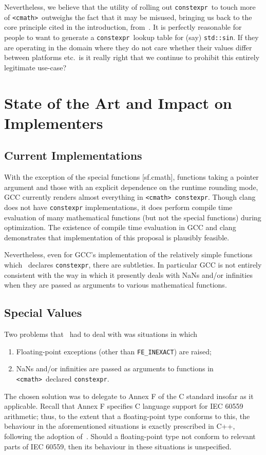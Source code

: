 \documentclass[prd,twocolumn,amsmath,amssymb,nofootinbib,eqsecnum]{revtex4-1}
\newcommand{\constexpr}{\code{constexpr}\xspace}
\newcommand{\code}[1]{{\tt #1}}
\newcommand{\header}[1]{{\tt <#1>}}
\newcommand{\cmath}{\header{cmath}}
\newcommand{\FEINEXACT}{{\tt FE\_INEXACT}}
\begin{document}
Nevertheless, we believe that the utility of rolling out \constexpr\ to touch more of \cmath\ outweighs the fact that it may be misused, bringing us back to the core principle cited in the introduction, from~\cite{DandE}.
It is perfectly reasonable for people to want to generate a \constexpr\ lookup table for (say) \code{std::sin}. If they are operating in the domain where they do not care whether their values differ between platforms etc.\ is it really right that we continue to prohibit this entirely legitimate use-case?

\section{State of the Art and Impact on Implementers}

\subsection{Current Implementations}

With the exception of the special functions [sf.cmath], functions taking a pointer argument and those with an explicit dependence on the runtime rounding mode, GCC currently renders almost everything in \cmath\ \constexpr. Though clang does not have \constexpr implementations, it does perform compile time evaluation of many mathematical functions (but not the special functions) during optimization. The existence of compile time evaluation in GCC and clang demonstrates that implementation of this proposal is plausibly feasible. 

Nevertheless, even for GCC's implementation of the relatively simple functions which~\cite{Rosten-constexpr} declares \constexpr, there are subtleties. In particular GCC is not entirely consistent with the way in which it presently deals with NaNs and/or infinities when they are passed as arguments to various mathematical functions.


\subsection{Special Values}

Two problems that~\cite{Rosten-constexpr} had to deal with was situations in which
\begin{enumerate}

\item Floating-point exceptions (other than \FEINEXACT) are raised;

\item NaNs and/or infinities are passed as arguments to functions in \cmath\ declared \constexpr.

\end{enumerate}
The chosen solution was to delegate to Annex F of the C standard insofar as it applicable.
Recall that Annex F specifies C language support for IEC 60559 arithmetic; thus, to the extent that a
floating-point type conforms to this, the behaviour in the aforementioned situations is 
exactly prescribed in C++, following the adoption of~\cite{Rosten-constexpr}. Should a
floating-point type not conform to relevant parts of IEC 60559, then its behaviour in these
situations is unspecified.
\end{document}
